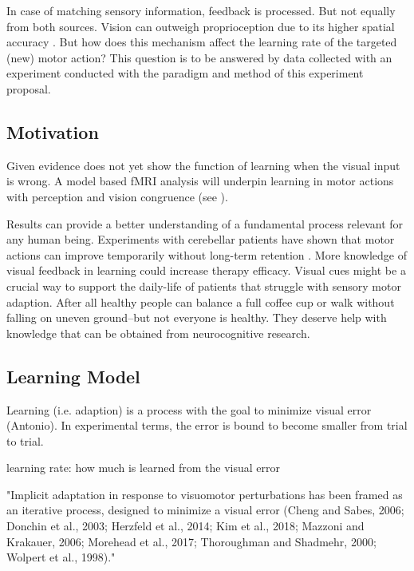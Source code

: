 \documentclass[man]{apa7}
\begin{document}
In case of matching sensory information, feedback is processed. But not equally from both sources. Vision can outweigh proprioception due to its higher spatial accuracy \parencite{Limanowski2016}. But how does this mechanism affect the learning rate of the targeted (new) motor action? This question is to be answered by data collected with an experiment conducted with the paradigm and method of this experiment proposal.

\subsection{Motivation}

Given evidence does not yet show the function of learning when the visual input is wrong. A model based fMRI analysis will underpin learning in motor actions with perception and vision congruence (see \cite{Limanowski2016}).

Results can provide a better understanding of a fundamental process relevant for any human being. Experiments with cerebellar patients have shown that motor actions can improve temporarily without long-term retention \parencite{seidler2013motor}. More knowledge of visual feedback in learning could increase therapy efficacy. Visual cues might be a crucial way to support the daily-life of patients that struggle with sensory motor adaption. After all healthy people can balance a full coffee cup or walk without falling on uneven ground–but not everyone is healthy. They deserve help with knowledge that can be obtained from neurocognitive research.


\subsection{Learning Model}

Learning (i.e. adaption) is a process with the goal to minimize visual error (Antonio). In experimental terms, the error is bound to become smaller from trial to trial.

learning rate: how much is learned from the visual error

"Implicit adaptation in response to visuomotor perturbations has been framed as an iterative process, designed to minimize a visual error (Cheng and Sabes, 2006; Donchin et al., 2003; Herzfeld et al., 2014; Kim et al., 2018; Mazzoni and Krakauer, 2006; Morehead et al., 2017; Thoroughman and Shadmehr, 2000; Wolpert et al., 1998)." \parencite{Tsay2022}
\end{document}
